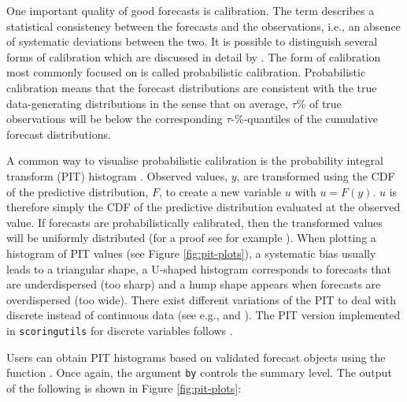 \documentclass[
]{jss}
\begin{document}
One important quality of good forecasts is calibration. The term
describes a statistical consistency between the forecasts and the
observations, i.e., an absence of systematic deviations between the two.
It is possible to distinguish several forms of calibration which are
discussed in detail by
\cite{gneitingProbabilisticForecastsCalibration2007}. The form of
calibration most commonly focused on is called probabilistic
calibration. Probabilistic calibration means that the forecast
distributions are consistent with the true data-generating distributions
in the sense that on average, \(\tau\)\% of true observations will be
below the corresponding \(\tau\)-\%-quantiles of the cumulative forecast
distributions.

A common way to visualise probabilistic calibration is the probability
integral transform (PIT) histogram
\citep{dawidPresentPositionPotential1984}. Observed values, \(y\), are
transformed using the CDF of the predictive distribution, \(F\), to
create a new variable \(u\) with \(u = F(y)\). \(u\) is therefore simply
the CDF of the predictive distribution evaluated at the observed value.
If forecasts are probabilistically calibrated, then the transformed
values will be uniformly distributed (for a proof see for example
\citet{angusProbabilityIntegralTransform1994}). When plotting a
histogram of PIT values (see Figure \ref{fig:pit-plots}), a systematic
bias usually leads to a triangular shape, a U-shaped histogram
corresponds to forecasts that are underdispersed (too sharp) and a hump
shape appears when forecasts are overdispersed (too wide). There exist
different variations of the PIT to deal with discrete instead of
continuous data (see e.g., \cite{czadoPredictiveModelAssessment2009} and
\cite{funkAssessingPerformanceRealtime2019}). The PIT version
implemented in \texttt{scoringutils} for discrete variables follows
\cite{funkAssessingPerformanceRealtime2019}.

Users can obtain PIT histograms based on validated forecast objects
using the function . Once again, the
argument \texttt{by} controls the summary level. The output of the
following is shown in Figure \ref{fig:pit-plots}:
\end{document}
